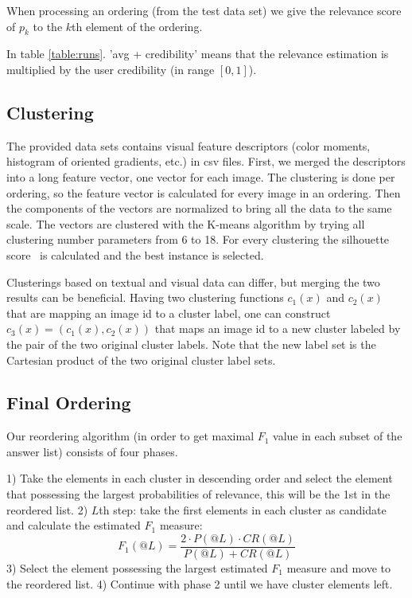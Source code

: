\documentclass{acm_proc_article-me}
\begin{document}
When processing an ordering (from the test data set) we give the relevance score of $p_k$ to the $k$th element of the ordering.

In table \ref{table:runs}. 'avg + credibility' means that the relevance estimation is multiplied by the user credibility (in range $[0,1]$). 

\subsection{Clustering}
\label{sec:clust}

The provided data sets contains visual feature descriptors (color moments, histogram of oriented gradients, etc.) in csv files. First, we merged the descriptors into a long feature vector, one vector for each image. The clustering is done per ordering, so the feature vector is calculated for every image in an ordering. Then the components of the vectors are normalized to bring all the data to the same scale. The vectors are clustered with the K-means algorithm by trying all clustering number parameters from 6 to 18. For every clustering the silhouette score~\cite{rousseeuw1987silhouettes} is calculated and the best instance is selected.

Clusterings based on textual and visual data can differ, but merging the two results can be beneficial. Having two clustering functions $c_1(x)$ and $c_2(x)$ that are mapping an image id to a cluster label, one can construct $c_3(x) = (c_1(x), c_2(x))$ that maps an image id to a new cluster labeled by the pair of the two original cluster labels. Note that the new label set is the Cartesian product of the two original cluster label sets.

\subsection{Final Ordering}

Our reordering algorithm (in order to get maximal $F_1$ value in each subset of the answer list) consists of four phases.

1) Take the elements in each cluster in descending order and select the element that possessing the largest probabilities of relevance, this will be the 1st in the reordered list.
2) $L$th step: take the first elements in each cluster as candidate and calculate the estimated $F_1$ measure: $$F_1(@L) = \frac{2 \cdot P(@L) \cdot CR(@L)}{P(@L) + CR(@L)}$$
3) Select the element possessing the largest estimated $F_1$ measure and move to the reordered list.
4) Continue with phase 2 until we have cluster elements left.
\end{document}
